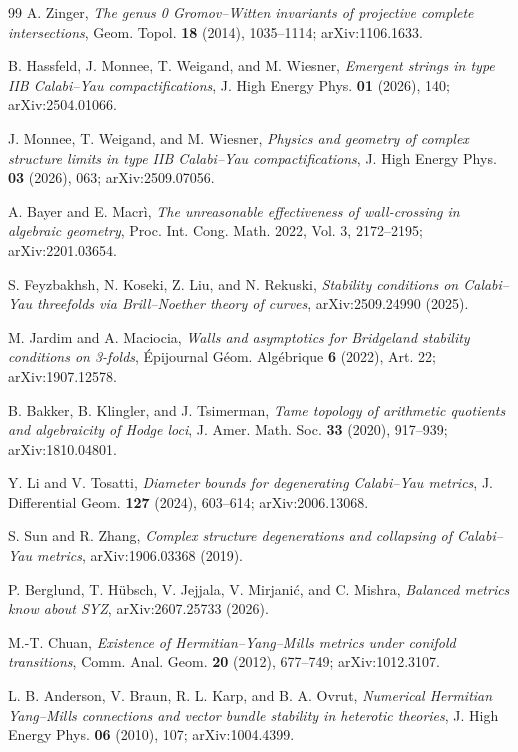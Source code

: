 \documentclass[11pt]{article}
\theoremstyle{definition}
\begin{document}
\begin{thebibliography}{99}
 A. Zinger, \emph{The genus 0 Gromov--Witten invariants of projective complete intersections}, Geom. Topol. \textbf{18} (2014), 1035--1114; arXiv:1106.1633.

 B. Hassfeld, J. Monnee, T. Weigand, and M. Wiesner, \emph{Emergent strings in type IIB Calabi--Yau compactifications}, J. High Energy Phys. \textbf{01} (2026), 140; arXiv:2504.01066.

 J. Monnee, T. Weigand, and M. Wiesner, \emph{Physics and geometry of complex structure limits in type IIB Calabi--Yau compactifications}, J. High Energy Phys. \textbf{03} (2026), 063; arXiv:2509.07056.

 A. Bayer and E. Macr\`i, \emph{The unreasonable effectiveness of wall-crossing in algebraic geometry}, Proc. Int. Cong. Math. 2022, Vol. 3, 2172--2195; arXiv:2201.03654.

 S. Feyzbakhsh, N. Koseki, Z. Liu, and N. Rekuski, \emph{Stability conditions on Calabi--Yau threefolds via Brill--Noether theory of curves}, arXiv:2509.24990 (2025).

 M. Jardim and A. Maciocia, \emph{Walls and asymptotics for Bridgeland stability conditions on 3-folds}, \'Epijournal G\'eom. Alg\'ebrique \textbf{6} (2022), Art. 22; arXiv:1907.12578.

 B. Bakker, B. Klingler, and J. Tsimerman, \emph{Tame topology of arithmetic quotients and algebraicity of Hodge loci}, J. Amer. Math. Soc. \textbf{33} (2020), 917--939; arXiv:1810.04801.

 Y. Li and V. Tosatti, \emph{Diameter bounds for degenerating Calabi--Yau metrics}, J. Differential Geom. \textbf{127} (2024), 603--614; arXiv:2006.13068.

 S. Sun and R. Zhang, \emph{Complex structure degenerations and collapsing of Calabi--Yau metrics}, arXiv:1906.03368 (2019).

 P. Berglund, T. H\"ubsch, V. Jejjala, V. Mirjani\'c, and C. Mishra, \emph{Balanced metrics know about SYZ}, arXiv:2607.25733 (2026).

 M.-T. Chuan, \emph{Existence of Hermitian--Yang--Mills metrics under conifold transitions}, Comm. Anal. Geom. \textbf{20} (2012), 677--749; arXiv:1012.3107.

 L. B. Anderson, V. Braun, R. L. Karp, and B. A. Ovrut, \emph{Numerical Hermitian Yang--Mills connections and vector bundle stability in heterotic theories}, J. High Energy Phys. \textbf{06} (2010), 107; arXiv:1004.4399.


\end{thebibliography}
\end{document}
